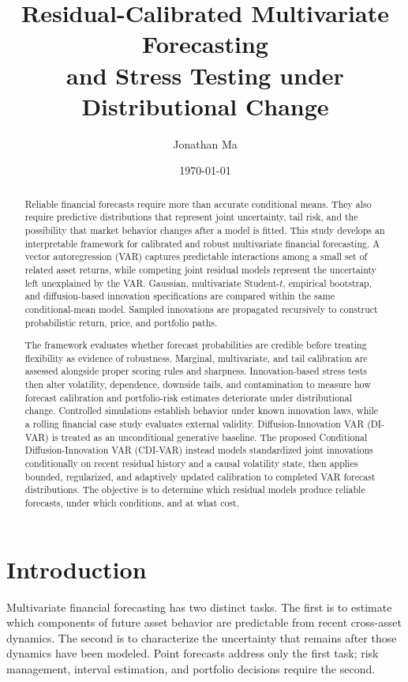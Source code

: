 \documentclass[11pt]{article}
\title{Residual-Calibrated Multivariate Forecasting\\
and Stress Testing under Distributional Change}
\author{Jonathan Ma}
\date{\today}
\begin{document}
\maketitle

\begin{abstract}
Reliable financial forecasts require more than accurate conditional means. They also require predictive distributions that represent joint uncertainty, tail risk, and the possibility that market behavior changes after a model is fitted. This study develops an interpretable framework for calibrated and robust multivariate financial forecasting. A vector autoregression (VAR) captures predictable interactions among a small set of related asset returns, while competing joint residual models represent the uncertainty left unexplained by the VAR. Gaussian, multivariate Student-$t$, empirical bootstrap, and diffusion-based innovation specifications are compared within the same conditional-mean model. Sampled innovations are propagated recursively to construct probabilistic return, price, and portfolio paths.

The framework evaluates whether forecast probabilities are credible before treating flexibility as evidence of robustness. Marginal, multivariate, and tail calibration are assessed alongside proper scoring rules and sharpness. Innovation-based stress tests then alter volatility, dependence, downside tails, and contamination to measure how forecast calibration and portfolio-risk estimates deteriorate under distributional change. Controlled simulations establish behavior under known innovation laws, while a rolling financial case study evaluates external validity. Diffusion-Innovation VAR (DI-VAR) is treated as an unconditional generative baseline. The proposed Conditional Diffusion-Innovation VAR (CDI-VAR) instead models standardized joint innovations conditionally on recent residual history and a causal volatility state, then applies bounded, regularized, and adaptively updated calibration to completed VAR forecast distributions. The objective is to determine which residual models produce reliable forecasts, under which conditions, and at what cost.
\end{abstract}

\newpage
\tableofcontents
\newpage

\section{Introduction}

Multivariate financial forecasting has two distinct tasks. The first is to estimate which components of future asset behavior are predictable from recent cross-asset dynamics. The second is to characterize the uncertainty that remains after those dynamics have been modeled. Point forecasts address only the first task; risk management, interval estimation, and portfolio decisions require the second.
\end{document}
